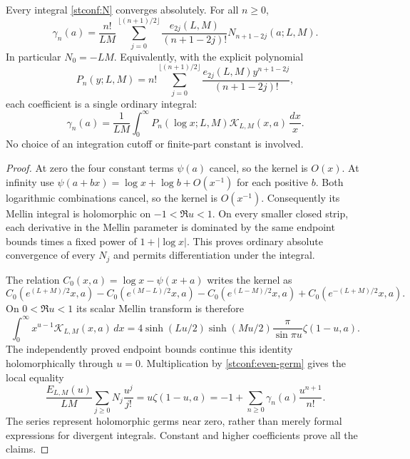 \begin{theorem}
\label{stconf:absolute}
Every integral \eqref{stconf:N} converges absolutely. For all $n\ge0$,
\begin{equation}\label{stconf:absolute-formula}
 \boxed{\displaystyle
 \gamma_n(a)=\frac{n!}{LM}
   \sum_{j=0}^{\lfloor(n+1)/2\rfloor}
    \frac{e_{2j}(L,M)}{(n+1-2j)!}N_{n+1-2j}(a;L,M).}
\end{equation}
In particular $N_0=-LM$. Equivalently, with the explicit polynomial
\[
 P_n(y;L,M)=n!\sum_{j=0}^{\lfloor(n+1)/2\rfloor}
                    \frac{e_{2j}(L,M)y^{n+1-2j}}{(n+1-2j)!},
\]
each coefficient is a single ordinary integral:
\begin{equation}\label{stconf:single}
 \gamma_n(a)=\frac1{LM}\int_0^\infty
          P_n(\log x;L,M)\mathcal K_{L,M}(x,a)\,\frac{dx}{x}.
\end{equation}
No choice of an integration cutoff or finite-part constant is involved.
\end{theorem}
\begin{proof}
At zero the four constant terms $\psi(a)$ cancel, so the kernel is
$O(x)$. At infinity use
$\psi(a+bx)=\log x+\log b+O(x^{-1})$ for each positive $b$.
Both logarithmic combinations cancel, so the kernel is $O(x^{-1})$.
Consequently its Mellin integral is holomorphic on
$-1<\Re u<1$. On every smaller closed strip, each derivative in the Mellin parameter
is dominated by the same endpoint bounds times a fixed power of
$1+|\log x|$. This proves ordinary absolute convergence of every
$N_j$ and permits differentiation under the integral.

The relation $C_0(x,a)=\log x-\psi(x+a)$ writes the kernel as
\[
 C_0(e^{(L+M)/2}x,a)-C_0(e^{(M-L)/2}x,a)
 -C_0(e^{(L-M)/2}x,a)+C_0(e^{-(L+M)/2}x,a).
\]
On $0<\Re u<1$ its scalar Mellin transform is therefore
\begin{equation}\label{stconf:digamma-mellin}
 \int_0^\infty x^{u-1}\mathcal K_{L,M}(x,a)\,dx
 =4\sinh(Lu/2)\sinh(Mu/2)
                \frac{\pi}{\sin\pi u}\zeta(1-u,a).
\end{equation}
The independently proved endpoint bounds continue this identity
holomorphically through $u=0$. Multiplication by
\eqref{stconf:even-germ} gives the local equality
\begin{equation}\label{stconf:absolute-germ}
 \frac{E_{L,M}(u)}{LM}\sum_{j\ge0}N_j\frac{u^j}{j!}
       =u\zeta(1-u,a)
       =-1+\sum_{n\ge0}\gamma_n(a)\frac{u^{n+1}}{n!}.
\end{equation}
The series represent holomorphic germs near zero, rather than merely
formal expressions for divergent integrals. Constant and higher
coefficients prove all the claims.
\end{proof}

